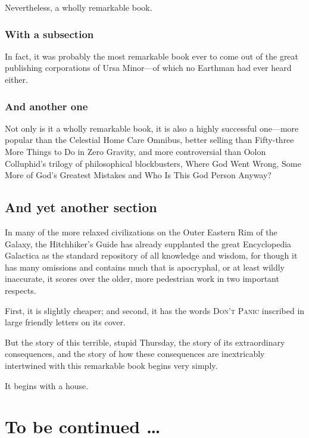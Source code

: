 \documentclass[a4paper, twocolumn, openany]{book}
\begin{document}
	Nevertheless, a wholly remarkable book.
	
	\subsection{With a subsection}
	
	In fact, it was probably the most remarkable book ever to come out of the great publishing corporations of Ursa Minor—of which no Earthman had ever heard either.
	
	\subsection{And another one}
	
	Not only is it a wholly remarkable book, it is also a highly successful one—more popular than the Celestial Home Care Omnibus, better selling than Fifty-three More Things to Do in Zero Gravity, and more controversial than Oolon Colluphid’s trilogy of philosophical blockbusters, Where God Went Wrong, Some More of God’s Greatest Mistakes and Who Is This God Person Anyway?
	
	\section{And yet another section}
	
	In many of the more relaxed civilizations on the Outer Eastern Rim of the Galaxy, the Hitchhiker’s Guide has already supplanted the great Encyclopedia Galactica as the standard repository of all knowledge and wisdom, for though it has many omissions and contains much that is apocryphal, or at least wildly inaccurate, it scores over the older, more pedestrian work in two important respects.
	
	First, it is slightly cheaper; and second, it has the words \textsc{Don't Panic} inscribed in large friendly letters on its cover.
	
	But the story of this terrible, stupid Thursday, the story of its extraordinary consequences, and the story of how these consequences are inextricably intertwined with this remarkable book begins very simply.
	
	It begins with a house.
	
	\newpage
	
	\chapter*{To be continued \ldots}
		
\end{document}
